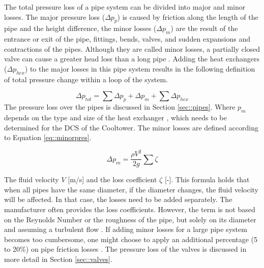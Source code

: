 The total pressure loss of a pipe system can be divided into major and minor losses. The major pressure loss ($\Delta p_p$) is caused by friction along the length of the pipe and the height difference, the minor losses ($\Delta p_m$) are the result of the entrance or exit of the pipe, fittings, bends, valves, and sudden expansions and contractions of the pipes. Although they are called minor losses, a partially closed valve can cause a greater head loss than a long pipe \cite{white2011fluid}. Adding the heat exchangers ($\Delta p_{hex}$) to the major losses in this pipe system results in the following definition of total pressure change within a loop of the system. 

\begin{equation}
    \Delta p_{tot} = \sum \Delta p_{p} + \Delta p_m + \sum \Delta p_{hex} 
\end{equation}
The pressure loss over the pipes is discussed in Section \ref{sec::pipes}. Where $p_m$ depends on the type and size of the heat exchanger \cite{YvoPutter}, which needs to be determined for the DCS of the Cooltower. The minor losses are defined according to Equation \ref{eq::minorpres}.

\begin{equation}\label{eq::minorpres}
    \Delta p_m = \frac{\rho V^2}{2g} \sum \zeta
\end{equation}

The fluid velocity $V$ [m/s] and the loss coefficient $\zeta$ [-]. This formula holds that when all pipes have the same diameter, if the diameter changes, the fluid velocity will be affected. In that case, the losses need to be added separately. The manufacturer often provides the loss coefficients. However, the term is not based on the Reynolds Number or the roughness of the pipe, but solely on its diameter and assuming a turbulent flow \cite{white2011fluid}. If adding minor losses for a large pipe system becomes too cumbersome, one might choose to apply an additional percentage (5 to 20\%) on pipe friction losses \cite{echtephdthesis}. The pressure loss of the valves is discussed in more detail in Section \ref{sec::valves}.


